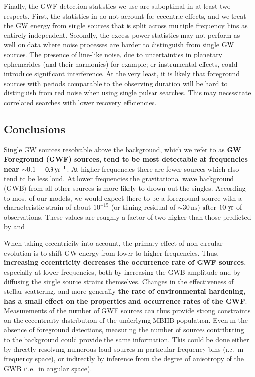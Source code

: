 \documentclass[useAMS, usenatbib]{mnras}  %
\newcommand{\nanos}{\textrm{ns}}
\begin{document}
        Finally, the GWF detection statistics we use are suboptimal in at least two respects.  First, the statistics in \citet{rsg15} do not account for eccentric effects, and we treat the GW energy from single sources that is split across multiple frequency bins as entirely independent.  Secondly, the excess power statistics may not perform as well on data where noise processes are harder to distinguish from single GW sources.  The presence of line-like noise, due to uncertainties in planetary ephemerides (and their harmonics) for example; or instrumental effects, could introduce significant interference.  At the very least, it is likely that foreground sources with periods comparable to the observing duration will be hard to distinguish from red noise when using single pulsar searches.  This may necessitate correlated searches with lower recovery efficiencies.

    \subsection{Conclusions}

        Single GW sources resolvable above the background, which we refer to as \textbf{GW Foreground (GWF) sources, tend to be most detectable at frequencies near $\sim 0.1$ -- $0.3 \, \textrm{yr}^{-1}$}.  At higher frequencies there are fewer sources which also tend to be less loud.  At lower frequencies the gravitational wave background (GWB) from all other sources is more likely to drown out the singles.  According to most of our models, we would expect there to be a foreground source with a characteristic strain of about $10^{-15}$ (or timing residual of $\sim 30 \, \nanos$) after $10 \, \,\mathrm{yr}$ of observations.  These values are roughly a factor of two higher than those predicted by \citet[][e.g.~Fig.~3]{sesana2009} and \citet[][e.g.~Fig.~4]{ravi2014}

        When taking eccentricity into account, the primary effect of non-circular evolution is to shift GW energy from lower to higher frequencies.  Thus, \textbf{increasing eccentricity decreases the occurrence rate of GWF sources}, especially at lower frequencies, both by increasing the GWB amplitude and by diffusing the single source strains themselves.  Changes in the effectiveness of stellar scattering, and more generally \textbf{the rate of environmental hardening, has a small effect on the properties and occurrence rates of the GWF}.  Measurements of the number of GWF sources can thus provide strong constraints on the eccentricity distribution of the underlying MBHB population.  Even in the absence of foreground detections, measuring the number of sources contributing to the background could provide the same information.  This could be done either by directly resolving numerous loud sources in particular frequency bins (i.e.~in frequency space), or indirectly by inference from the degree of anisotropy of the GWB (i.e.~in angular space).
\end{document}
